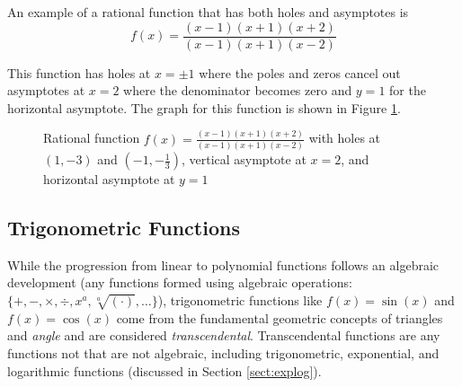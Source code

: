 \begin{example} An example of a rational function that has both holes and asymptotes is
    $$
    f(x) = \frac{(x-1)(x+1)(x+2)}{(x-1)(x+1)(x-2)}
    $$

    \noindent This function has holes at $x = \pm 1$ where the poles and zeros cancel out asymptotes at $x = 2$ where the denominator becomes zero and $y = 1$ for the horizontal asymptote. The graph for this function is shown in Figure \ref{fig:rationalholeandasymptote}.

    \begin{figure}[!ht]
        \centering
                \caption{Rational function $f(x) = \frac{(x-1)(x+1)(x+2)}{(x-1)(x+1)(x-2)}$ with holes at $(1,-3)$ and $(-1,-\frac{1}{3})$, vertical asymptote at $x=2$, and horizontal asymptote at $y=1$}
                \label{fig:rationalholeandasymptote}
            \end{figure}
        \end{example}

        \subsection{Trigonometric Functions}
        While the progression from linear to polynomial functions follows an algebraic development (any functions formed using algebraic operations: $\{+,-,\times,\div,x^a,\sqrt[a]{(\cdot)},\dots\}$), trigonometric functions like $f(x) = \sin(x)$ and $f(x) = \cos(x)$ come from the fundamental geometric concepts of triangles and \textit{angle} and are considered \textit{transcendental}. Transcendental functions are any functions not that are not algebraic, including trigonometric, exponential, and logarithmic functions (discussed in Section \ref{sect:explog}).

